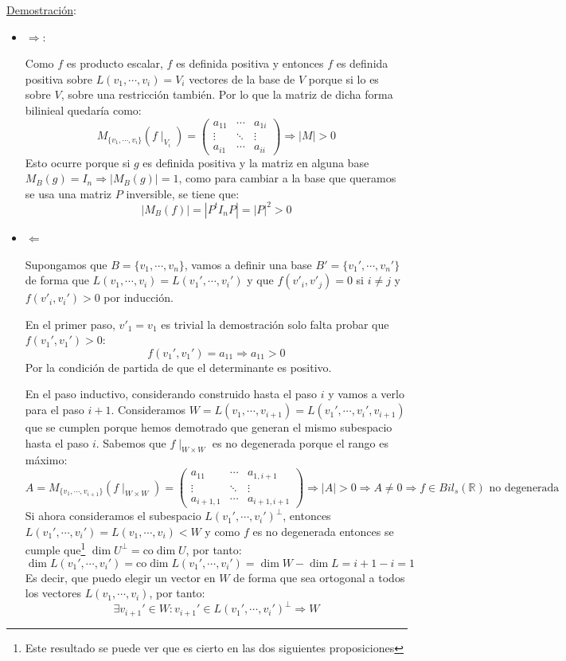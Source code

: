 \documentclass[10pt,a4paper,openright]{book}
\theoremstyle{break}
\begin{document}
\underline{Demostración}:
\begin{itemize}
\item $\Rightarrow $:

Como $f$ es producto escalar, $f$ es definida positiva y entonces $f$ es definida positiva sobre $L(v_1, \cdots, v_i) = V_i$ vectores de la base de $V$ porque si lo es sobre $V$, sobre una restricción también. Por lo que la matriz de dicha forma bilinieal quedaría como:
$$M_{\{v_1, \cdots, v_i\}}(f\mid_{V_i})=\begin{pmatrix} a_{11} & \cdots & a_{1i} \\ \vdots & \ddots & \vdots \\ a_{i1} & \cdots & a_{ii}\end{pmatrix} \Rightarrow |M| > 0$$
Esto ocurre porque si $g$ es definida positiva y la matriz en alguna base $M_B(g) = I_n\Rightarrow |M_B(g)|=1$, como para cambiar a la base que queramos se usa una matriz $P$ inversible, se tiene que:
$$|M_B(f)|=|P^tI_nP|=|P|^2 > 0$$

\item $\Leftarrow$

Supongamos que $B=\{v_1, \cdots, v_n\}$, vamos a definir una base $B'=\{v_1', \cdots, v_n'\}$ de forma que $L(v_1, \cdots, v_i) = L(v_1', \cdots, v_i')$ y que $f(v'_i, v'_j)=0$ si $i\neq j$ y $f(v'_i, v_i')>0$ por inducción.

En el primer paso, $v'_1=v_1$ es trivial la demostración solo falta probar que $f(v_1', v_1')>0$:
$$f(v_1', v_1') = a_{11}\Rightarrow a_{11}>0$$
Por la condición de partida de que el determinante es positivo.

En el paso inductivo, considerando construido hasta el paso $i$ y vamos a verlo para el paso $i+1$. Consideramos $W=L(v_1, \cdots, v_{i+1}) = L(v_1', \cdots, v_i', v_{i+1})$ que se cumplen porque hemos demotrado que generan el mismo subespacio hasta el paso $i$. Sabemos que $f\mid_{W\times W}$ es no degenerada porque el rango es máximo:
$$A = M_{\{v_1, \cdots, v_{i+1}\}}(f\mid_{W\times W}) = \begin{pmatrix} a_{11} & \cdots & a_{1,i+1} \\ \vdots & \ddots & \vdots \\ a_{i+1,1} & \cdots & a_{i+1,i+1}\end{pmatrix}\Rightarrow |A| > 0 \Rightarrow A\neq 0\Rightarrow f\in Bil_s(\mathbb R)\mbox{ no degenerada}$$
Si ahora consideramos el subespacio $L(v_1', \cdots, v_i')^\perp$, entonces $L(v_1', \cdots , v_i') = L(v_1, \cdots, v_i)<W$ y como $f$ es no degenerada entonces se cumple que\footnote{Este resultado se puede ver que es cierto en las dos siguientes proposiciones} $\dim U^\perp = \mbox{co}\dim U$, por tanto:
$$\dim L(v_1', \cdots, v_i') = \mbox{co}\dim L(v_1', \cdots, v_i') = \dim W - \dim L = i+1-i = 1$$
Es decir, que puedo elegir un vector en $W$ de forma que sea ortogonal a todos los vectores $L(v_1, \cdots, v_i)$, por tanto:
$$\exists v_{i+1}'\in W: v_{i+1}'\in L(v_1', \cdots, v_i')^\perp\Rightarrow W$$


\end{itemize}
\end{document}
